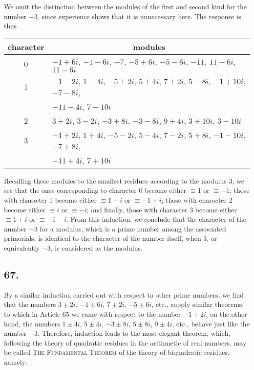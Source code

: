 \documentclass[twoside,12pt, showframe]{memoir}
\begin{document}
We omit the distinction between the modules of the first and second kind for the number \(-3\), since experience shows that it is unnecessary here. The response is thus
\begin{center}
\begin{tabular}{c|l}
character & \multicolumn{1}{c}{modules} \\
\hline
0 & \(-1+6 i\), \(-1-6 i\), \(-7\), \(-5+6 i\), \(-5-6 i\), \(-11\), \(11+6 i\), \( 11-6 i\) \\
1 & \(-1-2 i\), \( 1-4 i\), \(-5+2 i\), \( 5+4 i\), \( 7+2 i\), \( 5-8 i\), \(-1+10 i\), \(-7-8 i\),  \\
 & \quad \(-11-4 i\), \( 7-10 i\) \\
2 & \(3+2 i\), \( 3-2 i\), \(-3+8 i\), \(-3-8 i\), \( 9+4 i\), \( 3+10 i\), \( 3-10 i\) \\
3 & \(-1+2 i\), \( 1+4 i\), \(-5-2 i\), \( 5-4 i\), \( 7-2 i\), \( 5+8 i\), \(-1-10 i\), \(-7+8 i\), \\
 & \quad \(-11+4 i\), \( 7+10 i\) \\
\end{tabular}
\end{center}

Recalling these modules to the smallest residues according to the modulus \(3\), we see that the ones corresponding to character 0 become either \(\equiv 1\) or \(\equiv -1\); those with character 1 become either \(\equiv 1-i\) or \(\equiv -1+i\); those with character 2 become either \(\equiv i\) or \(\equiv -i\); and finally, those with character 3 become either \(\equiv 1+i\) or \(\equiv -1-i\). From this induction, we conclude that the character of the number \(-3\) for a modulus, which is a prime number among the associated primorials, is identical to the character of the number itself, when 3, or equivalently \(-3\), is considered as the modulus.
%

\subsection*{67.}

By a similar induction carried out with respect to other prime numbers, we find that the numbers \(3 \pm 2i\), \(-1 \pm 6i\), \(7 \pm 2i\), \(-5 \pm 6i\), etc., supply similar theorems, to which in Article 65 we came with respect to the number \(-1+2i\); on the other hand, the numbers \(1 \pm 4i\), \(5 \pm 4i\), \(-3 \pm 8i\), \(5 \pm 8i\), \(9 \pm 4i\), etc., behave just like the number \(-3\). Therefore, induction leads to the most elegant theorem, which, following the theory of quadratic residues in the arithmetic of real numbers, may be called \textsc{The Fundamental Theorem} of the theory of biquadratic residues, namely:
\end{document}
